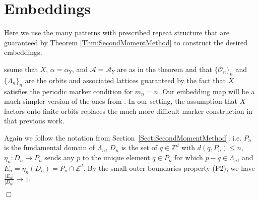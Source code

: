 \documentclass[12pt]{amsart}
\theoremstyle{definition}
\def\Z{\mathbb{Z}}
\newenvironment{ProofOfEmbeddingThm}[1]
{\par\vskip2\parsep\noindent{\sc Proof of Theorem\ \ref{Thm:Embeddings}. }}{{\hfill
$\Box$}
\par\vskip2\parsep}
\begin{document}
\section{Embeddings} \label{Sect:Embeddings}

Here we use the many patterns with prescribed repeat structure that are guaranteed by Theorem \ref{Thm:SecondMomentMethod} to construct the desired embeddings.

\vspace{2mm}

\begin{ProofOfEmbeddingThm}

Assume that $X$, $\alpha = \alpha_Y$, and $\mathcal{A} = \mathcal{A}_Y$ are as in the theorem and that $\{\mathcal{O}_n\}_n$ and $\{\Lambda_n\}_n$ are the orbits and associated lattices guaranteed by the fact that $X$ satisfies the periodic marker condition for $m_n = n$. Our embedding map will be a much simpler version of the ones from \cite{Lightwood2003,Lightwood2004}. In our setting, the assumption that $X$ factors onto finite orbits replaces the much more difficult marker construction in that previous work.

Again we follow the notation from Section~\ref{Sect:SecondMomentMethod}, i.e. $P_n$ is the fundamental domain of $\Lambda_n$, $D_n$ is the set of $q \in \mathbb{Z}^d$ with $d(q,P_n) \leq n$, $\eta_n: D_n \rightarrow P_n$ sends any $p$ to the unique element $q \in P_n$ for which $p-q \in \Lambda_n$, and $E_n = \eta_n(D_n) = P_n \cap \mathbb{Z}^d$. By the small outer boundaries property (P2), %
we have
$\frac{|E_n|}{|D_n|} \rightarrow 1$. 


\end{ProofOfEmbeddingThm}
\end{document}
